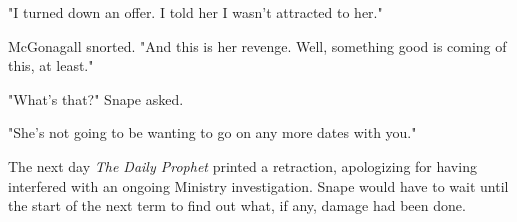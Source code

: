 \documentclass[a4paper,11pt]{article}
\begin{document}
"I turned down an offer. I told her I wasn't attracted to her."

McGonagall snorted. "And this is her revenge. Well, something good is coming of this, at least."

"What's that?" Snape asked.

"She's not going to be wanting to go on any more dates with you."

The next day \emph{The Daily Prophet} printed a retraction, apologizing for having interfered with an ongoing Ministry investigation. Snape would have to wait until the start of the next term to find out what, if any, damage had been done.
\end{document}
